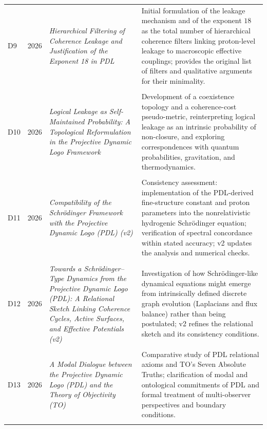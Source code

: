 \documentclass[11pt,a4paper]{article}
\begin{document}
\begin{longtable}{@{}llL{4cm}p{9.0cm}@{}}
D9 & 2026 & \textit{Hierarchical Filtering of Coherence Leakage and Justification of the Exponent 18 in PDL} &
Initial formulation of the leakage mechanism and of the exponent $18$ as the total number of hierarchical coherence filters linking proton-level leakage to macroscopic effective couplings; provides the original list of filters and qualitative arguments for their minimality. \citep{Exponent_18_PDL_2026} \\\\[0.5em]

D10 & 2026 & \textit{Logical Leakage as Self-Maintained Probability: A Topological Reformulation in the Projective Dynamic Logo Framework} &
Development of a coexistence topology and a coherence-cost pseudo-metric, reinterpreting logical leakage as an intrinsic probability of non-closure, and exploring correspondences with quantum probabilities, gravitation, and thermodynamics. \citep{Topological_Reformulation_PDL_2026} \\\\[0.5em]

D11 & 2026 & \textit{Compatibility of the Schr\"odinger Framework with the Projective Dynamic Logo (PDL) (v2)} &
Consistency assessment: implementation of the PDL-derived fine-structure constant and proton parameters into the nonrelativistic hydrogenic Schr\"odinger equation; verification of spectral concordance within stated accuracy; v2 updates the analysis and numerical checks. \citep{Schrodinger_PDL_v2_2026} \\\\[0.5em]

D12 & 2026 & \textit{Towards a Schr\"odinger--Type Dynamics from the Projective Dynamic Logo (PDL): A Relational Sketch Linking Coherence Cycles, Active Surfaces, and Effective Potentials (v2)} &
Investigation of how Schr\"odinger-like dynamical equations might emerge from intrinsically defined discrete graph evolution (Laplacians and flux balance) rather than being postulated; v2 refines the relational sketch and its consistency conditions. \citep{Schrodinger_Sketch_v2_2026} \\\\[0.5em]

D13 & 2026 & \textit{A Modal Dialogue between the Projective Dynamic Logo (PDL) and the Theory of Objectivity (TO)} &
Comparative study of PDL relational axioms and TO's Seven Absolute Truths; clarification of modal and ontological commitments of PDL and formal treatment of multi-observer perspectives and boundary conditions. \citep{PDL_TO_dialogue} \\\\[0.5em]


\end{longtable}
\end{document}
